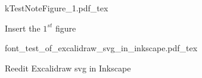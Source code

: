 \documentclass[12pt]{article}
\newcommand{\incfig}[1]{%
    \def\svgwidth{\columnwidth}
    {#1.pdf_tex}
}
\begin{document}

\begin{figure}[H]
    \centering
    \incfig{kTestNoteFigure_1}
    \caption{Insert the $1^{st}$ figure}
    \label{fig:kTestNoteFigure_1}
\end{figure}

\begin{figure}[H]
    \centering
    \incfig{font_test_of_excalidraw_svg_in_inkscape}
    \caption{Reedit Excalidraw svg in Inkscape}
    \label{fig:font_test_of_excalidraw_svg_in_inkscape}
\end{figure}
\end{document}

